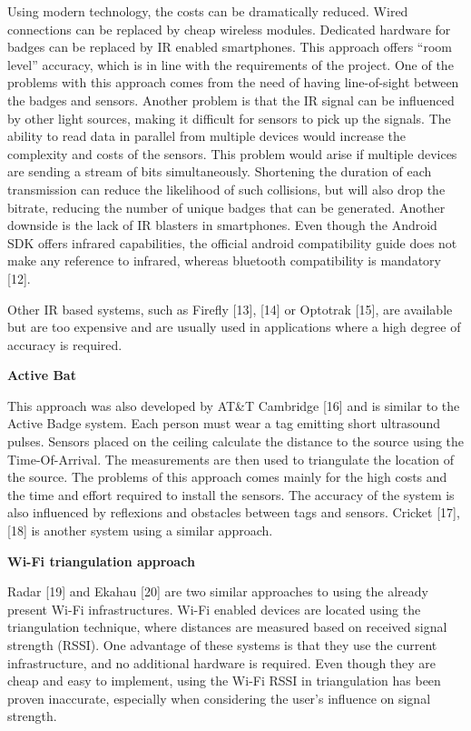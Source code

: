 Using modern technology, the costs can be dramatically reduced. Wired connections can be replaced by cheap wireless modules. Dedicated hardware for badges can be replaced by IR enabled smartphones. This approach offers “room level” accuracy, which is in line with the requirements of the project. One of the problems with this approach comes from the need of having line-of-sight between the badges and sensors. Another problem is that the IR signal can be influenced by other light sources, making it difficult for sensors to pick up the signals. The ability to read data in parallel from multiple devices would increase the complexity and costs of the sensors. This problem would arise if multiple devices are sending a stream of bits simultaneously. Shortening the duration of each transmission can reduce the likelihood of such collisions, but will also drop the bitrate, reducing the number of unique badges that can be generated. Another downside is the lack of IR blasters in smartphones. Even though the Android SDK offers infrared capabilities, the official android compatibility guide does not make any reference to infrared, whereas bluetooth compatibility is mandatory [12].

Other IR based systems, such as Firefly [13], [14] or Optotrak [15], are available but are too expensive and are usually used in applications where a high degree of accuracy is required. 

\medskip
\noindent \textbf{Active Bat}

This approach was also developed by AT\&T Cambridge [16] and is similar to the Active Badge system. Each person must wear a tag emitting short ultrasound pulses. Sensors placed on the ceiling calculate the distance to the source using the Time-Of-Arrival. The measurements are then used to triangulate the location of the source. The problems of this approach comes mainly for the high costs and the time and effort required to install the sensors. The accuracy of the system is also influenced by reflexions and obstacles between tags and sensors. Cricket [17], [18] is another system using a similar approach.

\medskip
\noindent \textbf{Wi-Fi triangulation approach}

Radar [19] and Ekahau [20] are two similar approaches to using the already present Wi-Fi infrastructures. Wi-Fi enabled devices are located using the triangulation technique, where distances are measured based on received signal strength (RSSI). One advantage of these systems is that they use the current infrastructure, and no additional hardware is required. Even though they are cheap and easy to implement, using the Wi-Fi RSSI in triangulation has been proven inaccurate, especially when considering the user’s influence on signal strength. 

